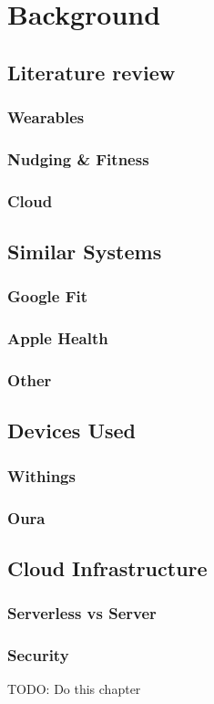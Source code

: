 \chapter{Background}
\label{cha:background}
\section{Literature review}
\subsection{Wearables}
\subsection{Nudging \& Fitness}
\subsection{Cloud}
\section{Similar Systems}
\label{section:similarSystems}
\subsection{Google Fit}
\subsection{Apple Health}
\subsection{Other}
\section{Devices Used}
\subsection{Withings}
\subsection{Oura}
\section{Cloud Infrastructure}
\subsection{Serverless vs Server}
\subsection{Security}


TODO: Do this chapter